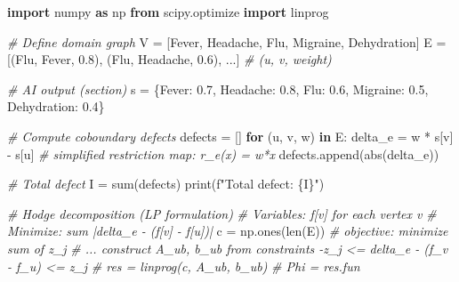 \documentclass[
]{article}
\newenvironment{Shaded}{}{}
\newcommand{\BuiltInTok}[1]{\textcolor[rgb]{0.00,0.50,0.00}{#1}}
\newcommand{\CommentTok}[1]{\textcolor[rgb]{0.38,0.63,0.69}{\textit{#1}}}
\newcommand{\ControlFlowTok}[1]{\textcolor[rgb]{0.00,0.44,0.13}{\textbf{#1}}}
\newcommand{\FloatTok}[1]{\textcolor[rgb]{0.25,0.63,0.44}{#1}}
\newcommand{\ImportTok}[1]{\textcolor[rgb]{0.00,0.50,0.00}{\textbf{#1}}}
\newcommand{\KeywordTok}[1]{\textcolor[rgb]{0.00,0.44,0.13}{\textbf{#1}}}
\newcommand{\NormalTok}[1]{#1}
\newcommand{\OperatorTok}[1]{\textcolor[rgb]{0.40,0.40,0.40}{#1}}
\newcommand{\SpecialCharTok}[1]{\textcolor[rgb]{0.25,0.44,0.63}{#1}}
\newcommand{\SpecialStringTok}[1]{\textcolor[rgb]{0.73,0.40,0.53}{#1}}
\newcommand{\StringTok}[1]{\textcolor[rgb]{0.25,0.44,0.63}{#1}}
\begin{document}
\begin{Shaded}
\begin{Highlighting}[]
\ImportTok{import}\NormalTok{ numpy }\ImportTok{as}\NormalTok{ np}
\ImportTok{from}\NormalTok{ scipy.optimize }\ImportTok{import}\NormalTok{ linprog}

\CommentTok{\# Define domain graph}
\NormalTok{V }\OperatorTok{=}\NormalTok{ [}\StringTok{\textquotesingle{}Fever\textquotesingle{}}\NormalTok{, }\StringTok{\textquotesingle{}Headache\textquotesingle{}}\NormalTok{, }\StringTok{\textquotesingle{}Flu\textquotesingle{}}\NormalTok{, }\StringTok{\textquotesingle{}Migraine\textquotesingle{}}\NormalTok{, }\StringTok{\textquotesingle{}Dehydration\textquotesingle{}}\NormalTok{]}
\NormalTok{E }\OperatorTok{=}\NormalTok{ [(}\StringTok{\textquotesingle{}Flu\textquotesingle{}}\NormalTok{, }\StringTok{\textquotesingle{}Fever\textquotesingle{}}\NormalTok{, }\FloatTok{0.8}\NormalTok{), (}\StringTok{\textquotesingle{}Flu\textquotesingle{}}\NormalTok{, }\StringTok{\textquotesingle{}Headache\textquotesingle{}}\NormalTok{, }\FloatTok{0.6}\NormalTok{), ...]  }\CommentTok{\# (u, v, weight)}

\CommentTok{\# AI output (section)}
\NormalTok{s }\OperatorTok{=}\NormalTok{ \{}\StringTok{\textquotesingle{}Fever\textquotesingle{}}\NormalTok{: }\FloatTok{0.7}\NormalTok{, }\StringTok{\textquotesingle{}Headache\textquotesingle{}}\NormalTok{: }\FloatTok{0.8}\NormalTok{, }\StringTok{\textquotesingle{}Flu\textquotesingle{}}\NormalTok{: }\FloatTok{0.6}\NormalTok{, }\StringTok{\textquotesingle{}Migraine\textquotesingle{}}\NormalTok{: }\FloatTok{0.5}\NormalTok{, }\StringTok{\textquotesingle{}Dehydration\textquotesingle{}}\NormalTok{: }\FloatTok{0.4}\NormalTok{\}}

\CommentTok{\# Compute coboundary defects}
\NormalTok{defects }\OperatorTok{=}\NormalTok{ []}
\ControlFlowTok{for}\NormalTok{ (u, v, w) }\KeywordTok{in}\NormalTok{ E:}
\NormalTok{    delta\_e }\OperatorTok{=}\NormalTok{ w }\OperatorTok{*}\NormalTok{ s[v] }\OperatorTok{{-}}\NormalTok{ s[u]  }\CommentTok{\# simplified restriction map: r\_e(x) = w*x}
\NormalTok{    defects.append(}\BuiltInTok{abs}\NormalTok{(delta\_e))}

\CommentTok{\# Total defect}
\NormalTok{I }\OperatorTok{=} \BuiltInTok{sum}\NormalTok{(defects)}
\BuiltInTok{print}\NormalTok{(}\SpecialStringTok{f"Total defect: }\SpecialCharTok{\{}\NormalTok{I}\SpecialCharTok{\}}\SpecialStringTok{"}\NormalTok{)}

\CommentTok{\# Hodge decomposition (LP formulation)}
\CommentTok{\# Variables: f[v] for each vertex v}
\CommentTok{\# Minimize: sum |delta\_e {-} (f[v] {-} f[u])|}
\NormalTok{c }\OperatorTok{=}\NormalTok{ np.ones(}\BuiltInTok{len}\NormalTok{(E))  }\CommentTok{\# objective: minimize sum of z\_j}
\CommentTok{\# ... construct A\_ub, b\_ub from constraints {-}z\_j \textless{}= delta\_e {-} (f\_v {-} f\_u) \textless{}= z\_j}
\CommentTok{\# res = linprog(c, A\_ub, b\_ub)}
\CommentTok{\# Phi = res.fun}


\end{Highlighting}
\end{Shaded}
\end{document}
